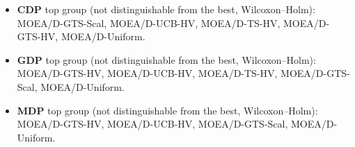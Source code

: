 \begin{table}[t]
\centering
\small
\setlength{\tabcolsep}{4pt}
\caption{Average ranks ($\mathrm{HV}_{\mathrm{norm}}$, lower is better), normalised regime, mean over 3 replicates per instance; baselines with the fixed budgets of Appendix A and no tuning (tuned baselines: Tables 13 and 14)}\label{tab:1}
\end{table}

\begin{itemize}
\item \textbf{CDP} top group (not distinguishable from the best, Wilcoxon--Holm): MOEA/D-GTS-Scal, MOEA/D-UCB-HV, MOEA/D-TS-HV, MOEA/D-GTS-HV, MOEA/D-Uniform.
\item \textbf{GDP} top group (not distinguishable from the best, Wilcoxon--Holm): MOEA/D-GTS-HV, MOEA/D-UCB-HV, MOEA/D-TS-HV, MOEA/D-GTS-Scal, MOEA/D-Uniform.
\item \textbf{MDP} top group (not distinguishable from the best, Wilcoxon--Holm): MOEA/D-GTS-HV, MOEA/D-UCB-HV, MOEA/D-GTS-Scal, MOEA/D-Uniform.
\end{itemize}

